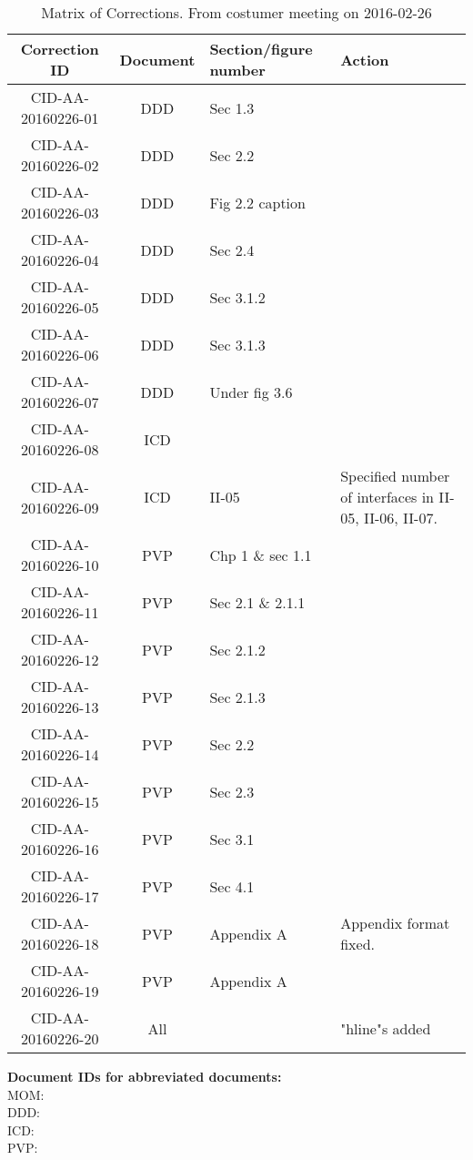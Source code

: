 \begin{table}[ht]
\centering
\begin{tabular}{|c|c|>{\centering\arraybackslash}p{3cm}|>{\centering\arraybackslash}p{5cm}|}
\hline \textbf{Correction ID} & \textbf{Document} & \textbf{Section/figure number} & \textbf{Action} \\ 
\hline CID-AA-20160226-01 & DDD & Sec 1.3 & \\ 
\hline CID-AA-20160226-02 & DDD & Sec 2.2 & \\ 
\hline CID-AA-20160226-03 & DDD & Fig 2.2 caption & \\ 
\hline CID-AA-20160226-04 & DDD & Sec 2.4 & \\ 
\hline CID-AA-20160226-05 & DDD & Sec 3.1.2 & \\ 
\hline CID-AA-20160226-06 & DDD & Sec 3.1.3 & \\ 
\hline CID-AA-20160226-07 & DDD & Under fig 3.6 & \\ 
\hline CID-AA-20160226-08 & ICD &  & \\ 
\hline CID-AA-20160226-09 & ICD & II-05 & Specified number of interfaces in II-05, II-06, II-07. \\ 
\hline CID-AA-20160226-10 & PVP & Chp 1 \& sec 1.1 & \\ 
\hline CID-AA-20160226-11 & PVP & Sec 2.1 \& 2.1.1 & \\ 
\hline CID-AA-20160226-12 & PVP & Sec 2.1.2 & \\ 
\hline CID-AA-20160226-13 & PVP & Sec 2.1.3 & \\ 
\hline CID-AA-20160226-14 & PVP & Sec 2.2 & \\ 
\hline CID-AA-20160226-15 & PVP & Sec 2.3 & \\ 
\hline CID-AA-20160226-16 & PVP & Sec 3.1 & \\ 
\hline CID-AA-20160226-17 & PVP & Sec 4.1 & \\ 
\hline CID-AA-20160226-18 & PVP & Appendix A & Appendix format fixed.\\ 
\hline CID-AA-20160226-19 & PVP & Appendix A & \\ 
\hline CID-AA-20160226-20 & All &  & "hline"s added \\
\hline 
\end{tabular}
\caption{Matrix of Corrections. From costumer meeting on 2016-02-26}
\label{tb:MoC} 
\end{table}

\vspace{20pt}
\noindent \textbf{Document IDs for abbreviated documents:}\\
MOM:        \momFebTwentySix \\
DDD:        \ddd \\
ICD:        \icd \\
PVP:        \pvp \\